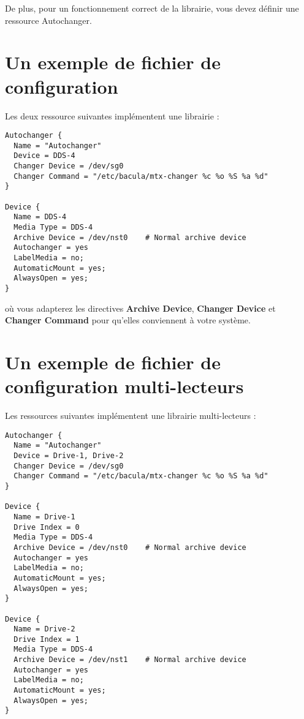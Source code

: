 De plus, pour un fonctionnement correct de la librairie, vous devez d\'efinir 
une ressource Autochanger.


\label{example}
\section{Un exemple de fichier de configuration}

Les deux ressource suivantes impl\'ementent une librairie :

\footnotesize
\begin{verbatim}
Autochanger {
  Name = "Autochanger"
  Device = DDS-4
  Changer Device = /dev/sg0
  Changer Command = "/etc/bacula/mtx-changer %c %o %S %a %d"
}

Device {
  Name = DDS-4
  Media Type = DDS-4
  Archive Device = /dev/nst0    # Normal archive device
  Autochanger = yes
  LabelMedia = no;
  AutomaticMount = yes;
  AlwaysOpen = yes;
}
\end{verbatim}
\normalsize

o\`u vous adapterez les directives {\bf Archive Device}, {\bf Changer Device} et 
{\bf Changer Command} pour qu'elles conviennent \`a votre syst\`eme.

\section{Un exemple de fichier de configuration multi-lecteurs}

Les ressources suivantes impl\'ementent une librairie multi-lecteurs :

\footnotesize
\begin{verbatim}
Autochanger {
  Name = "Autochanger"
  Device = Drive-1, Drive-2
  Changer Device = /dev/sg0
  Changer Command = "/etc/bacula/mtx-changer %c %o %S %a %d"
}

Device {
  Name = Drive-1
  Drive Index = 0
  Media Type = DDS-4
  Archive Device = /dev/nst0    # Normal archive device
  Autochanger = yes
  LabelMedia = no;
  AutomaticMount = yes;
  AlwaysOpen = yes;
}

Device {
  Name = Drive-2
  Drive Index = 1
  Media Type = DDS-4
  Archive Device = /dev/nst1    # Normal archive device
  Autochanger = yes
  LabelMedia = no;
  AutomaticMount = yes;
  AlwaysOpen = yes;
}

\end{verbatim}
\normalsize

